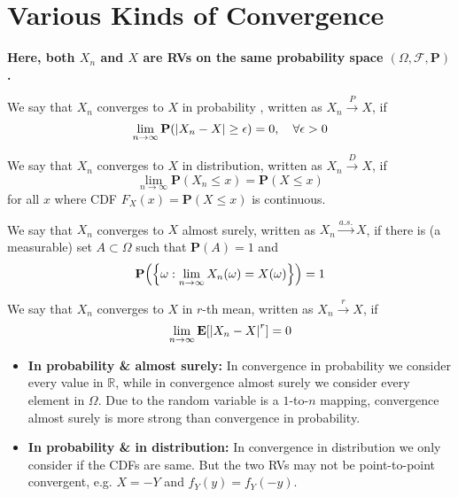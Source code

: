 \section{Various Kinds of Convergence}
\begin{remark}
    \textbf{Here, both $X_n$ and $X$ are RVs on the same probability space $(\Omega, \mathcal{F}, \mathbf{P})$.}
\end{remark}
\begin{definition}
    We say that $X_n$ converges to $X$ in probability , written as $X_n \xrightarrow{P} X$, if
    \begin{equation}
        \lim_{n \to \infty} \mathbf{P}(\abs{X_n - X} \geq \epsilon) = 0, \quad \forall \epsilon > 0
    \end{equation}
\end{definition}
\begin{definition}
    We say that $X_n$ converges to $X$ in distribution, written as $X_n \xrightarrow{D} X$, if
    \begin{equation}
        \lim_{n \to \infty} \mathbf{P}(X_n \leq x) = \mathbf{P}(X \leq x)
    \end{equation}
    for all $x$ where CDF $F_X(x) = \mathbf{P}(X \leq x)$ is continuous.
\end{definition}
\begin{definition}
    We say that $X_n$ converges to $X$ almost surely, written as $X_n \xrightarrow{a.s.} X$, if there is (a measurable) set $A \subset \Omega$ such that $\mathbf{P}(A) = 1$ and 
    \begin{equation}
        \mathbf{P}\qty(\qty{\omega: \lim_{n\to\infty}X_n(\omega) = X(\omega)}) = 1
    \end{equation}
\end{definition}
\begin{definition}
    We say that $X_n$ converges to $X$ in $r$-th mean, written as $X_n \xrightarrow{r} X$, if
    \begin{equation}
        \lim_{n \to \infty} \mathbf{E}[\abs{X_n - X}^r] = 0
    \end{equation}
\end{definition}
\begin{remark}
    \begin{itemize}
        \item \textbf{In probability \& almost surely:} In convergence in probability we consider every value in $\mathbb{R}$, while in convergence almost surely we consider every element in $\Omega$. Due to the random variable is a $1$-to-$n$ mapping, convergence almost surely is more strong than convergence in probability.
        \item \textbf{In probability \& in distribution:} In convergence in distribution we only consider if the CDFs are same. But the two RVs may not be point-to-point convergent, e.g. $X = -Y$ and $f_Y(y) = f_Y(-y)$.
    \end{itemize}
\end{remark}

